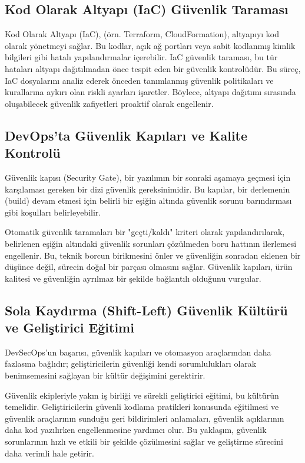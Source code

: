 \subsection{Kod Olarak Altyapı (IaC) Güvenlik Taraması}

Kod Olarak Altyapı (IaC), (örn. Terraform, CloudFormation), altyapıyı kod olarak yönetmeyi sağlar. Bu kodlar, açık ağ portları veya sabit kodlanmış kimlik bilgileri gibi hatalı yapılandırmalar içerebilir. IaC güvenlik taraması, bu tür hataları altyapı dağıtılmadan önce tespit eden bir güvenlik kontrolüdür. Bu süreç, IaC dosyalarını analiz ederek önceden tanımlanmış güvenlik politikaları ve kurallarına aykırı olan riskli ayarları işaretler. Böylece, altyapı dağıtımı sırasında oluşabilecek güvenlik zafiyetleri proaktif olarak engellenir.

\subsection{DevOps'ta Güvenlik Kapıları ve Kalite Kontrolü}

Güvenlik kapısı (Security Gate), bir yazılımın bir sonraki aşamaya geçmesi için karşılaması gereken bir dizi güvenlik gereksinimidir. Bu kapılar, bir derlemenin (build) devam etmesi için belirli bir eşiğin altında güvenlik sorunu barındırması gibi koşulları belirleyebilir.

Otomatik güvenlik taramaları bir "geçti/kaldı" kriteri olarak yapılandırılarak, belirlenen eşiğin altındaki güvenlik sorunları çözülmeden boru hattının ilerlemesi engellenir. Bu, teknik borcun birikmesini önler ve güvenliğin sonradan eklenen bir düşünce değil, sürecin doğal bir parçası olmasını sağlar. Güvenlik kapıları, ürün kalitesi ve güvenliğin ayrılmaz bir şekilde bağlantılı olduğunu vurgular.

\subsection{Sola Kaydırma (Shift-Left) Güvenlik Kültürü ve Geliştirici Eğitimi}

DevSecOps'un başarısı, güvenlik kapıları ve otomasyon araçlarından daha fazlasına bağlıdır; geliştiricilerin güvenliği kendi sorumlulukları olarak benimsemesini sağlayan bir kültür değişimini gerektirir.

Güvenlik ekipleriyle yakın iş birliği ve sürekli geliştirici eğitimi, bu kültürün temelidir. Geliştiricilerin güvenli kodlama pratikleri konusunda eğitilmesi ve güvenlik araçlarının sunduğu geri bildirimleri anlamaları, güvenlik açıklarının daha kod yazılırken engellenmesine yardımcı olur. Bu yaklaşım, güvenlik sorunlarının hızlı ve etkili bir şekilde çözülmesini sağlar ve geliştirme sürecini daha verimli hale getirir.

